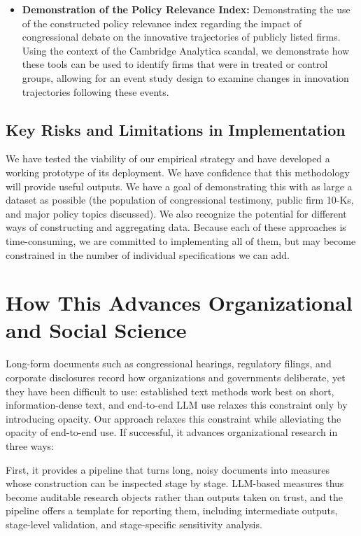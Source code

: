 \documentclass[11pt]{article}
\begin{document}
\begin{itemize}
    \item \textbf{Demonstration of the Policy Relevance Index:} Demonstrating the use of the constructed policy relevance index regarding the impact of congressional debate on the innovative trajectories of publicly listed firms. Using the context of the Cambridge Analytica scandal, we demonstrate how these tools can be used to identify firms that were in treated or control groups, allowing for an event study design to examine changes in innovation trajectories following these events.
\end{itemize}

\subsection{Key Risks and Limitations in Implementation}

We have tested the viability of our empirical strategy and have developed a working prototype of its deployment. We have confidence that this methodology will provide useful outputs. We have a goal of demonstrating this with as large a dataset as possible (the population of congressional testimony, public firm 10-Ks, and major policy topics discussed). We also recognize the potential for different ways of constructing and aggregating data. Because each of these approaches is time-consuming, we are committed to implementing all of them, but may become constrained in the number of individual specifications we can add.

\section{How This Advances Organizational and Social Science}

Long-form documents such as congressional hearings, regulatory filings, and corporate disclosures record how organizations and governments deliberate, yet they have been difficult to use: established text methods work best on short, information-dense text, and end-to-end LLM use relaxes this constraint only by introducing opacity. Our approach relaxes this constraint while alleviating the opacity of end-to-end use. If successful, it advances organizational research in three ways:

First, it provides a pipeline that turns long, noisy documents into measures whose construction can be inspected stage by stage. LLM-based measures thus become auditable research objects rather than outputs taken on trust, and the pipeline offers a template for reporting them, including intermediate outputs, stage-level validation, and stage-specific sensitivity analysis.
\end{document}
